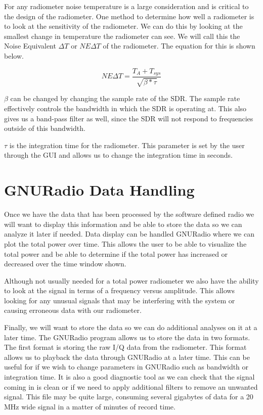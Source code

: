 For any radiometer noise temperature is a large consideration and is critical to the design of the radiometer.  One method to determine how well a radiometer is to look at the sensitivity of the radiometer.  We can do this by looking at the smallest change in temperature the radiometer can see.  We will call this the Noise Equivalent $\Delta T$ or $NE\Delta T$ of the radiometer.  The equation for this is shown below.

\begin{equation}
NE\Delta T=\frac{T_{A}+T_{sys}}{\sqrt{\beta * \tau}}
\end{equation}

$\beta$ can be changed by changing the sample rate of the SDR.  The sample rate effectively controls the bandwidth in which the SDR is operating at.  This also gives us a band-pass filter as well, since the SDR will not respond to frequencies outside of this bandwidth.  

$\tau$ is the integration time for the radiometer.  This parameter is set by the user through the GUI and allows us to change the integration time in seconds.

\section{GNURadio Data Handling}
Once we have the data that has been processed by the software defined radio we will want to display this information and be able to store the data so we can analyze it later if needed.  Data display can be handled GNURadio where we can plot the total power over time.  This allows the user to be able to visualize the total power and be able to determine if the total power has increased or decreased over the time window shown.  

Although not usually needed for a total power radiometer we also have the ability to look at the signal in terms of a frequency versus amplitude.  This allows looking for any unusual signals that may be interfering with the system or causing erroneous data with our radiometer.  

Finally, we will want to store the data so we can do additional analyses on it at a later time.  The GNURadio program allows us to store the data in two formats.  The first format is storing the raw I/Q data from the radiometer.  This format allows us to playback the data through GNURadio at a later time.  This can be useful for if we wish to change parameters in GNURadio such as bandwidth or integration time.  It is also a good diagnostic tool as we can check that the signal coming in is clean or if we need to apply additional filters to remove an unwanted signal. This file may be quite large, consuming several gigabytes of data for a 20 MHz wide signal in a matter of minutes of record time.

